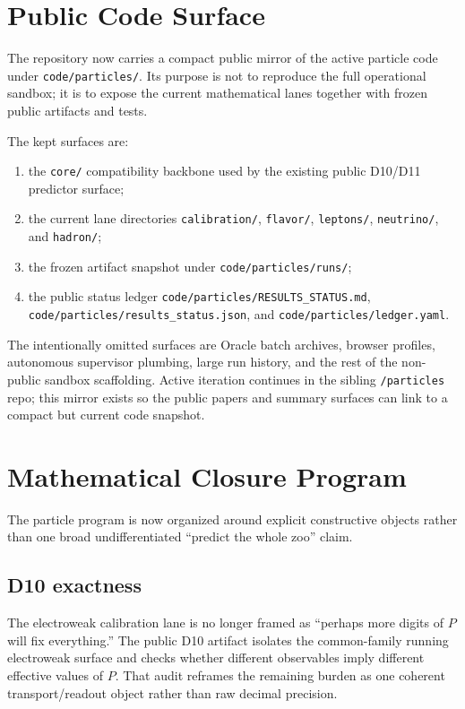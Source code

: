 \documentclass[11pt]{article}
\begin{document}
\section{Public Code Surface}

The repository now carries a compact public mirror of the active particle code
under \texttt{code/particles/}. Its purpose is not to reproduce the full
operational sandbox; it is to expose the current mathematical lanes together
with frozen public artifacts and tests.

The kept surfaces are:
\begin{enumerate}[leftmargin=2em]
\item the \texttt{core/} compatibility backbone used by the existing public
D10/D11 predictor surface;
\item the current lane directories
\texttt{calibration/}, \texttt{flavor/}, \texttt{leptons/},
\texttt{neutrino/}, and \texttt{hadron/};
\item the frozen artifact snapshot under \texttt{code/particles/runs/};
\item the public status ledger
\texttt{code/particles/RESULTS\_STATUS.md},
\texttt{code/particles/results\_status.json}, and
\texttt{code/particles/ledger.yaml}.
\end{enumerate}

The intentionally omitted surfaces are Oracle batch archives, browser profiles,
autonomous supervisor plumbing, large run history, and the rest of the
non-public sandbox scaffolding. Active iteration continues in the sibling
\texttt{/particles} repo; this mirror exists so the public papers and summary
surfaces can link to a compact but current code snapshot.

\section{Mathematical Closure Program}

The particle program is now organized around explicit constructive objects
rather than one broad undifferentiated ``predict the whole zoo'' claim.

\subsection{D10 exactness}

The electroweak calibration lane is no longer framed as ``perhaps more digits of
\(P\) will fix everything.'' The public D10 artifact isolates the common-family
running electroweak surface and checks whether different observables imply
different effective values of \(P\). That audit reframes the remaining burden as
one coherent transport/readout object rather than raw decimal precision.
\end{document}
